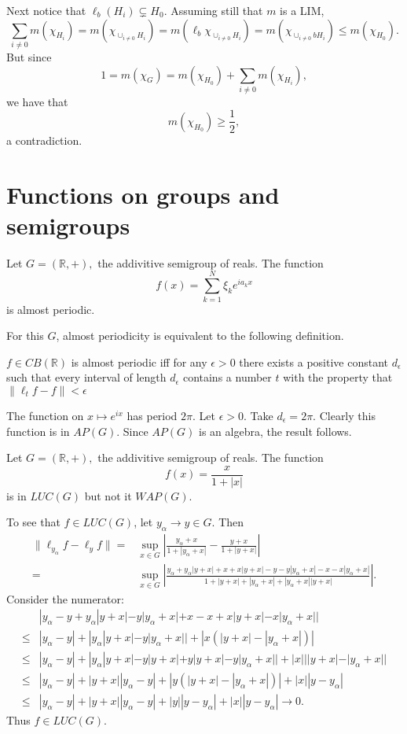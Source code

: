 \documentclass[12pt]{report}
\begin{document}
Next notice that $\ell_b (H_i) \subsetneq H_0$.  Assuming still that $m$ is a LIM,
\[
\sum_{i\neq 0} m(\chi_{H_i}) = m(\chi_{\cup_{i\neq 0} H_i}) = m(\ell_b \chi_{\cup_{i\neq 0} H_i})
= m(\chi_{\cup_{i\neq 0} bH_i}) \leq m(\chi_{H_0}).
\]
But since
\[
1=m(\chi_G) = m(\chi_{H_0}) + \sum_{i\neq 0}m(\chi_{H_i}),
\]
we have that
\[
m(\chi_{H_0}) \geq \frac{1}{2},
\]
a contradiction.
\done

\section{Functions on groups and semigroups}

\begin{example}
Let $G = (\mathbb{R}, +),$ the addivitive semigroup of reals.  The function
\[
f(x) = \sum_{k=1}^N \xi_k e^{ia_k x}
\]
is almost periodic.
\end{example}
\proof
For this $G$, almost periodicity is equivalent to the following definition.
\begin{defn}
$f\in CB(\mathbb{R})$ is almost periodic iff for any $\epsilon >0$ there exists a positive constant
$d_\epsilon$ such that every interval of length $d_\epsilon$ contains a number $t$ with the property that
$\|\ell_t f - f\| < \epsilon$
\end{defn}
The function on $x\mapsto e^{ix}$ has period $2\pi$. Let $\epsilon > 0$.  Take $d_\epsilon = 2\pi$.
Clearly this function is in $AP(G)$.  Since $AP(G)$ is an algebra, the result follows.
\done

\begin{example}
Let $G = (\mathbb{R}, +),$ the addivitive semigroup of reals.  The function
\[
f(x) = \frac{x}{1+|x|}
\]
is in $LUC(G)$ but not it $WAP(G)$.
\end{example}
\proof
To see that $f\in LUC(G)$, let $y_\alpha \rightarrow y \in G$.  Then
\begin{align*}
\|\ell_{y_\alpha} f - \ell_y f\| =& \sup_{x\in G}\left| \frac{y_\alpha +x}{1+|y_\alpha +x|} - \frac{y+x}{1+|y+x|} \right|\\
=&\sup_{x\in G}\left| \frac{y_\alpha + y_\alpha |y+x| + x + x|y+x| - y - y|y_\alpha + x| - x - x|y_\alpha + x|}{1+|y+x|+|y_\alpha + x| + |y_\alpha + x| |y+x|} \right|.
\end{align*}
Consider the numerator:
\begin{align*}
& |y_\alpha - y + y_\alpha|y+x| - y|y_\alpha +x| + x-x + x|y+x| - x|y_\alpha +x| | \\
\leq & |y_\alpha - y| + |y_\alpha|y+x| - y|y_\alpha+x|| + |x(|y+x| - |y_\alpha +x|)| \\
\leq & |y_\alpha - y| + |y_\alpha|y+x| - y|y+x| + y|y+x| - y|y_\alpha +x|| + |x|||y+x| - |y_\alpha +x|| \\
\leq & |y_\alpha - y| + |y+x||y_\alpha -y| + |y(|y+x| - |y_\alpha +x|)| + |x||y-y_\alpha| \\
\leq & |y_\alpha - y| + |y+x||y_\alpha -y| + |y||y-y_\alpha| + |x||y-y_\alpha|\rightarrow 0.
\end{align*}
Thus $f\in LUC(G)$.
\done
\end{document}
